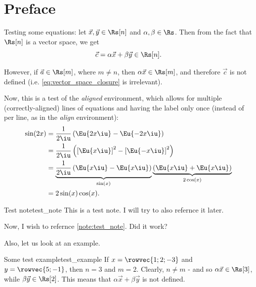 \section{Preface}
\lipsum[1]

Testing some equations: let $\vec{x},\vec{y}\in\Rs[n]$ and $\alpha,\beta\in\Rs$. Then from the fact that $\Rs[n]$ is a vector space, we get
\begin{equation}
	\vec{c} = \alpha\vec{x} + \beta\vec{y} \in \Rs[n].
	\label{eq:vector_space_closure}
\end{equation}

However, if $\vec{a}\in\Rs[m]$, where $m\neq n$, then $\alpha\vec{x}\in\Rs[m]$, and therefore $\vec{c}$ is not defined (i.e. \autoref{eq:vector_space_closure} is irrelevant).

Now, this is a test of the \textit{aligned} environment, which allows for multiple (correctly-aligned) lines of equations and having the label only once (instead of per line, as in the \textit{align} environment):
\begin{equation}
	\begin{aligned}
		\sin(2x) & = \frac{1}{2\iu}\left(\Eu{2x\iu}-\Eu{-2x\iu}\right)                                                                             \\
		         & = \frac{1}{2\iu}\left(\left[\Eu{x\iu}\right]^{2}-\left[\Eu{-x\iu}\right]^{2}\right)                                             \\
		         & = \underbrace{\frac{1}{2\iu}\left(\Eu{x\iu}-\Eu{x\iu}\right)}_{\sin(x)}\underbrace{\left(\Eu{x\iu}+\Eu{x\iu}\right)}_{2\cos(x)} \\
		         & = 2\sin(x)\cos(x).
	\end{aligned}
	\label{eq:aligned_env}
\end{equation}

\begin{note}{Test note}{test_note}
	This is a test note. I will try to also refernce it later.
\end{note}

Now, I wish to refernce \autoref{note:test_note}. Did it work?

Also, let us look at an example.

\begin{example}{Some test example}{test_example}
	If $x=\rowvec{1;2;-3}$ and $y=\rowvec{5;-1}$, then $n=3$ and $m=2$. Clearly, $n\neq m$ - and so $\alpha\vec{x}\in\Rs[3]$, while $\beta\vec{y}\in\Rs[2]$. This means that $\alpha\vec{x}+\beta\vec{y}$ is not defined.
\end{example}

